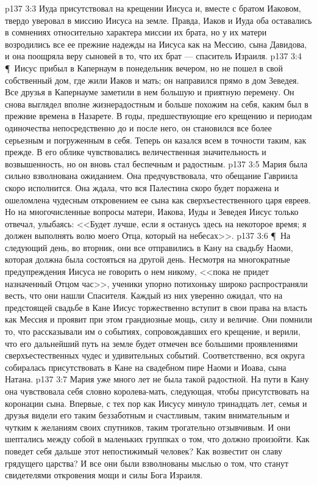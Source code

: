 \vs p137 3:3 Иуда присутствовал на крещении Иисуса и, вместе с братом Иаковом, твердо уверовал в миссию Иисуса на земле. Правда, Иаков и Иуда оба оставались в сомнениях относительно характера миссии их брата, но у их матери возродились все ее прежние надежды на Иисуса как на Мессию, сына Давидова, и она поощряла веру сыновей в то, что их брат --- спаситель Израиля.
\vs p137 3:4 \P\ Иисус прибыл в Капернаум в понедельник вечером, но не пошел в свой собственный дом, где жили Иаков и мать; он направился прямо в дом Зеведея. Все друзья в Капернауме заметили в нем большую и приятную перемену. Он снова выглядел вполне жизнерадостным и больше похожим на себя, каким был в прежние времена в Назарете. В годы, предшествующие его крещению и периодам одиночества непосредственно до и после него, он становился все более серьезным и погруженным в себя. Теперь он казался всем в точности таким, как прежде. В его облике чувствовались величественная значительность и возвышенность, но он вновь стал беспечным и радостным.
\vs p137 3:5 Мария была сильно взволнована ожиданием. Она предчувствовала, что обещание Гавриила скоро исполнится. Она ждала, что вся Палестина скоро будет поражена и ошеломлена чудесным откровением ее сына как сверхъестественного царя евреев. Но на многочисленные вопросы матери, Иакова, Иуды и Зеведея Иисус только отвечал, улыбаясь: <<Будет лучше, если я останусь здесь на некоторое время; я должен выполнять волю моего Отца, который на небесах>>.
\vs p137 3:6 \P\ На следующий день, во вторник, они все отправились в Кану на свадьбу Наоми, которая должна была состояться на другой день. Несмотря на многократные предупреждения Иисуса не говорить о нем никому, <<пока не придет назначенный Отцом час>>, ученики упорно потихоньку широко распространяли весть, что они нашли Спасителя. Каждый из них уверенно ожидал, что на предстоящей свадьбе в Кане Иисус торжественно вступит в свои права на власть как Мессия и проявит при этом грандиозные мощь, силу и величие. Они помнили то, что рассказывали им о событиях, сопровождавших его крещение, и верили, что его дальнейший путь на земле будет отмечен все большими проявлениями сверхъестественных чудес и удивительных событий. Соответственно, вся округа собиралась присутствовать в Кане на свадебном пире Наоми и Иоава, сына Натана.
\vs p137 3:7 Мария уже много лет не была такой радостной. На пути в Кану она чувствовала себя словно королева\hyp{}мать, следующая, чтобы присутствовать на коронации сына. Впервые, с тех пор как Иисусу минуло тринадцать лет, семья и друзья видели его таким беззаботным и счастливым, таким внимательным и чутким к желаниям своих спутников, таким трогательно отзывчивым. И они шептались между собой в маленьких группках о том, что должно произойти. Как поведет себя дальше этот непостижимый человек? Как возвестит он славу грядущего царства? И все они были взволнованы мыслью о том, что станут свидетелями откровения мощи и силы Бога Израиля.
